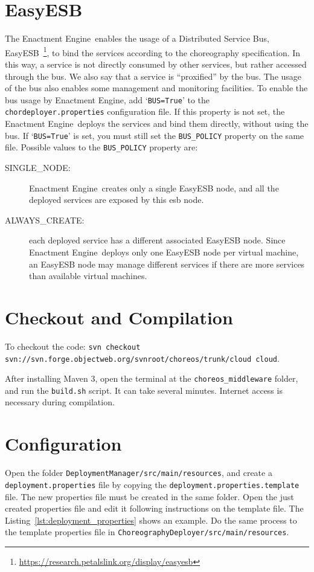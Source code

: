 \documentclass[a4paper, 10pt]{article}
\newcommand{\ee}{Enactment Engine}
\begin{document}
\section{EasyESB}

The \ee\ enables the usage of a Distributed Service Bus, EasyESB~\footnote{\url{https://research.petalslink.org/display/easyesb}}, to bind the services according to the choreography specification. In this way, a service is not directly consumed by other services, but rather accessed through the bus. We also say that a service is ``proxified'' by the bus. The usage of the bus also enables some management and monitoring facilities. To enable the bus usage by \ee, add `\texttt{BUS=True}' to the \texttt{chordeployer.properties} configuration file. If this property is not set, the \ee\ deploys the services and bind them directly, without using the bus. If `\texttt{BUS=True}' is set, you must still set the \texttt{BUS\_POLICY} property on the same file. Possible values to the \texttt{BUS\_POLICY} property are:

\begin{description}
\item [SINGLE\_NODE:] \ee\ creates only a single EasyESB node, and all the deployed services are exposed by this esb node.
\item [ALWAYS\_CREATE:] each deployed service has a different associated EasyESB node. Since \ee\ deploys only one EasyESB node per virtual machine, an EasyESB node may manage different services if there are more services than available virtual machines.
\end{description}

\section{Checkout and Compilation}

To checkout the code: \texttt{svn checkout svn://svn.forge.objectweb.org/svnroot/choreos/trunk/cloud cloud}. 

After installing Maven 3, open the terminal at the \texttt{choreos\_middleware} folder, and run the \texttt{build.sh} script. It can take several minutes. Internet access is necessary during compilation.

\section{Configuration}

Open the folder \texttt{DeploymentManager/src/main/resources}, and create a \texttt{deployment.properties} file by copying the \texttt{deployment.properties.template} file. The new properties file must be created in the same folder. Open the just created properties file and edit it following instructions on the template file. The Listing~\ref{lst:deployment_properties} shows an example. Do the same process to the template properties file in \texttt{ChoreographyDeployer/src/main/resources}.
\end{document}
